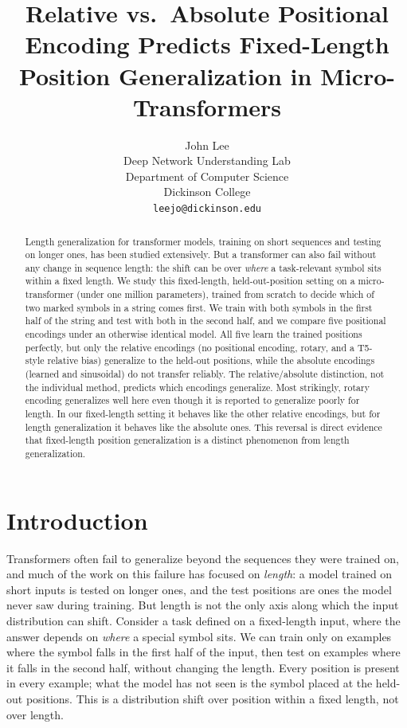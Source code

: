 \documentclass{article}
\title{Relative vs.\ Absolute Positional Encoding Predicts
Fixed-Length Position Generalization in Micro-Transformers}
\author{%
  John Lee \\
  Deep Network Understanding Lab \\
  Department of Computer Science \\
  Dickinson College \\
  \texttt{leejo@dickinson.edu} \\
}
\begin{document}
\maketitle

\begin{abstract}
Length generalization for transformer models, training on short sequences and
testing on longer ones, has been studied extensively. But a transformer can also fail without any change
in sequence length: the shift can be over \emph{where} a task-relevant symbol
sits within a fixed length. We study this fixed-length, held-out-position setting
on a micro-transformer (under one million parameters), trained from scratch to
decide which of two marked symbols in a string comes first. We train with both
symbols in the first half of the string and test with both in the second half, and
we compare five positional encodings under an otherwise identical model. All five learn the trained
positions perfectly, but only the relative encodings (no positional encoding,
rotary, and a T5-style relative bias) generalize to the held-out positions,
while the absolute encodings (learned and sinusoidal) do not transfer reliably.
The relative/absolute distinction, not the individual method, predicts
which encodings generalize. Most strikingly, rotary encoding generalizes well
here even though it is reported to generalize poorly for length. In our
fixed-length setting it behaves like the other relative encodings, but for length
generalization it behaves like the absolute ones. This reversal is direct evidence
that fixed-length position generalization is a distinct phenomenon from length
generalization.
\end{abstract}

\section{Introduction}

Transformers often fail to generalize beyond the sequences they were trained on,
and much of the work on this failure has focused on \emph{length}: a model
trained on short inputs is tested on longer ones, and the test positions are ones
the model never saw during training. But length is not the only axis along which
the input distribution can shift. Consider a task defined on a fixed-length
input, where the answer depends on \emph{where} a special symbol sits. We can
train only on examples where the symbol falls in the first half of the input,
then test on examples where it falls in the second half, without changing
the length. Every position is present in every example; what the model has not
seen is the symbol placed at the held-out positions. This is a distribution shift over
position within a fixed length, not over length.
\end{document}
